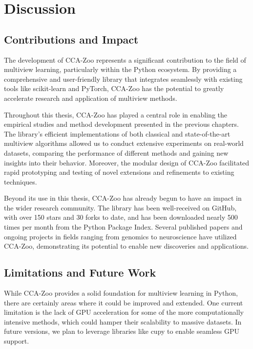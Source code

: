 \section{Discussion}

\subsection{Contributions and Impact}

The development of CCA-Zoo represents a significant contribution to the field of multiview learning, particularly within the Python ecosystem. By providing a comprehensive and user-friendly library that integrates seamlessly with existing tools like scikit-learn and PyTorch, CCA-Zoo has the potential to greatly accelerate research and application of multiview methods.

Throughout this thesis, CCA-Zoo has played a central role in enabling the empirical studies and method development presented in the previous chapters. The library's efficient implementations of both classical and state-of-the-art multiview algorithms allowed us to conduct extensive experiments on real-world datasets, comparing the performance of different methods and gaining new insights into their behavior. Moreover, the modular design of CCA-Zoo facilitated rapid prototyping and testing of novel extensions and refinements to existing techniques.

Beyond its use in this thesis, CCA-Zoo has already begun to have an impact in the wider research community. The library has been well-received on GitHub, with over 150 stars and 30 forks to date, and has been downloaded nearly 500 times per month from the Python Package Index. Several published papers and ongoing projects in fields ranging from genomics to neuroscience have utilized CCA-Zoo, demonstrating its potential to enable new discoveries and applications.

\subsection{Limitations and Future Work}

While CCA-Zoo provides a solid foundation for multiview learning in Python, there are certainly areas where it could be improved and extended. One current limitation is the lack of GPU acceleration for some of the more computationally intensive methods, which could hamper their scalability to massive datasets. In future versions, we plan to leverage libraries like cupy to enable seamless GPU support.

